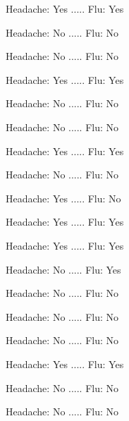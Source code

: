 \documentclass{article}\usepackage{graphicx, color}
\begin{document}
\pagestyle{empty}
\begin{multicols}{3}

\noindent Headache: Yes .....      Flu: Yes

\bigskip
\bigskip

\noindent Headache: No .....      Flu: No

\bigskip
\bigskip

\noindent Headache: No .....      Flu: No

\bigskip
\bigskip

\noindent Headache: Yes .....      Flu: Yes

\bigskip
\bigskip

\noindent Headache: No .....      Flu: No

\bigskip
\bigskip

\noindent Headache: No .....      Flu: No

\bigskip
\bigskip

\noindent Headache: Yes .....      Flu: Yes

\bigskip
\bigskip

\noindent Headache: No .....      Flu: No

\bigskip
\bigskip

\noindent Headache: Yes .....      Flu: No

\bigskip
\bigskip

\noindent Headache: Yes .....      Flu: Yes

\bigskip
\bigskip

\noindent Headache: Yes .....      Flu: Yes

\bigskip
\bigskip

\noindent Headache: No .....      Flu: Yes

\bigskip
\bigskip

\noindent Headache: No .....      Flu: No

\bigskip
\bigskip

\noindent Headache: No .....      Flu: No

\bigskip
\bigskip

\noindent Headache: No .....      Flu: No

\bigskip
\bigskip

\noindent Headache: Yes .....      Flu: Yes

\bigskip
\bigskip

\noindent Headache: No .....      Flu: No

\bigskip
\bigskip

\noindent Headache: No .....      Flu: No


\end{multicols}
\end{document}
